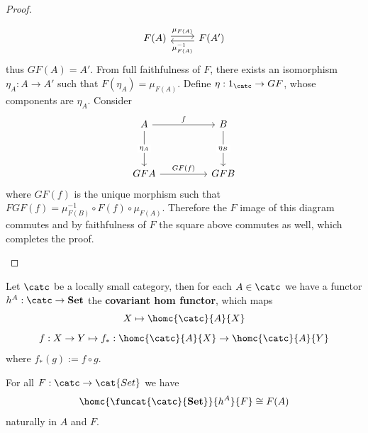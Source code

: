 \begin{proof}[Proof]
\begin{enumerate}
\[\begin{tikzcd}
	{F(A)} & {F(A')}
	\arrow["{\mu_{F(A)}}", shift left, from=1-1, to=1-2]
	\arrow["{\mu_{F(A)}^{-1}}", shift left, from=1-2, to=1-1]
\end{tikzcd}\]
	thus $GF(A) = A'$. From full faithfulness of $F$, there exists
	an isomorphism $\eta_A : A \to A'$ such that $F(\eta_A) = \mu_{F(A)}$.
	Define $\eta : 1_\catc \to GF$, whose components are $\eta_A$. Consider
	\[\begin{tikzcd}
	A && B \\
	\\
	GFA && GFB
	\arrow["f", from=1-1, to=1-3]
	\arrow["{\eta_A}"{description}, from=1-1, to=3-1]
	\arrow["{\eta_B}"{description}, from=1-3, to=3-3]
	\arrow["{GF(f)}", from=3-1, to=3-3]
\end{tikzcd}\]
	where $GF(f)$ is the unique morphism such that $FGF(f) = \mu_{F(B)}^{-1} \circ F(f) \circ \mu_{F(A)}$.
	Therefore the $F$ image of this diagram commutes and by faithfulness of $F$ the square above
	commutes as well, which completes the proof.
\end{enumerate}
\end{proof}
\begin{definition}
	Let $\catc$ be a locally small category, then for each $A\in\catc$
	we have a 
	functor $h^A : \catc\to\textbf{Set}$ the \textbf{covariant 
	hom functor}, which maps 
	\[
		X \mapsto \homc{\catc}{A}{X}
	\]
	\[
		f : X \to Y \mapsto f_\ast : \homc{\catc}{A}{X} \to \homc{\catc}{A}{Y}
	\]
		where $f_\ast(g) := f\circ g$.
\end{definition}
\begin{lemma}[Yoneda]
	For all $F : \catc \to \cat{Set}$ we have
	\[
		\homc{\funcat{\catc}{\textbf{Set}}}{h^A}{F} \cong F(A)
	\]
	naturally in $A$ and $F$.
\end{lemma}